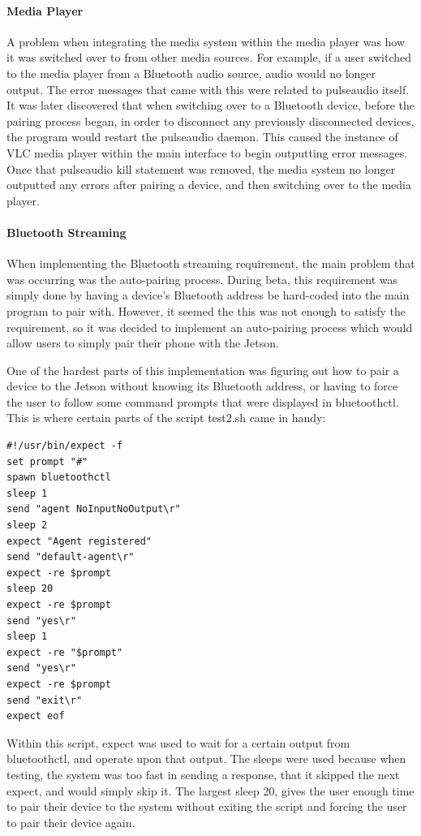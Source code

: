 \documentclass[onecolumn, draftclsnofoot, 10pt, compsoc]{IEEEtran}
\begin{document}
\paragraph{\textbf{Media Player}}
A problem when integrating the media system within the media player was how it was switched over to from other media sources. For example, if a user switched to the media player from a Bluetooth audio source, audio would no longer output. The error messages that came with this were related to pulseaudio itself. 
It was later discovered that when switching over to a Bluetooth device, before the pairing process began, in order to disconnect any previously disconnected devices, the program would restart the pulseaudio daemon. This caused the instance of VLC media player within the main interface to begin outputting error messages. Once that pulseaudio kill statement was removed, the media system no longer outputted any errors after pairing a device, and then switching over to the media player.

\paragraph{\textbf{Bluetooth Streaming}}
When implementing the Bluetooth streaming requirement, the main problem that was occurring was the auto-pairing process. During beta, this requirement was simply done by having a device's Bluetooth address be hard-coded into the main program to pair with. However, it seemed the this was not enough to satisfy the requirement, so it was decided to implement an auto-pairing process which would allow users to simply pair their phone with the Jetson. \par
One of the hardest parts of this implementation was figuring out how to pair a device to the Jetson without knowing its Bluetooth address, or having to force the user to follow some command prompts that were displayed in bluetoothctl. This is where certain parts of the script test2.sh came in handy: \par

\begin{verbatim}
#!/usr/bin/expect -f
set prompt "#"
spawn bluetoothctl
sleep 1
send "agent NoInputNoOutput\r"
sleep 2
expect "Agent registered"
send "default-agent\r"
expect -re $prompt
sleep 20
expect -re $prompt
send "yes\r"
sleep 1
expect -re "$prompt"
send "yes\r"
expect -re $prompt
send "exit\r"
expect eof
\end{verbatim}


Within this script, expect was used to wait for a certain output from bluetoothctl, and operate upon that output. The sleeps were used because when testing, the system was too fast in sending a response, that it skipped the next expect, and would simply skip it. The largest sleep 20, gives the user enough time to pair their device to the system without exiting the script and forcing the user to pair their device again.\par
\end{document}
